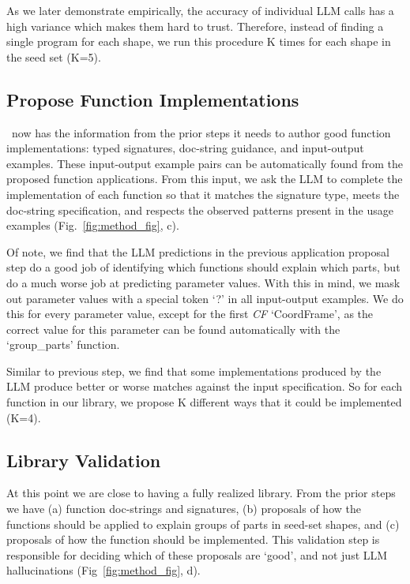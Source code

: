 As we later demonstrate empirically, the accuracy of individual LLM calls has a high variance which makes them hard to trust. 
Therefore, instead of finding a single program for each shape, we run this procedure K times for each shape in the seed set (K=5).


\subsection{Propose Function Implementations}
\label{sec:prop_impls}

\methodname~now has the information from the prior steps it needs to author good function implementations: typed signatures, doc-string guidance, and input-output examples.
These input-output example pairs can be automatically found from the proposed function applications.
From this input, we ask the LLM to complete the implementation of each function so that it matches the signature type, meets the doc-string specification, and respects the observed patterns present in the usage examples (Fig.~\ref{fig:method_fig}, c). 

Of note, we find that the LLM predictions in the previous application proposal step do a good job of identifying which functions should explain which parts, but do a much worse job at predicting parameter values. With this in mind, we mask out parameter values with a special token `?' in all input-output examples.
We do this for every parameter value, except for the first \textit{CF} `CoordFrame', as the correct value for this parameter can be found automatically with the `group\_parts' function.


Similar to previous step, we find that some implementations produced by the LLM produce better or worse matches against the input specification.
So for each function in our library, we propose K different ways that it could be implemented (K=4).

\subsection{Library Validation}
\label{sec:lib_validation}

At this point we are close to having a fully realized library.
From the prior steps we have (a) function doc-strings and signatures, (b) proposals of how the functions should be applied to explain groups of parts in seed-set shapes, and (c) proposals of how the function should be implemented.
This validation step is responsible for deciding which of these proposals are `good', and not just LLM hallucinations
(Fig~\ref{fig:method_fig}, d).

